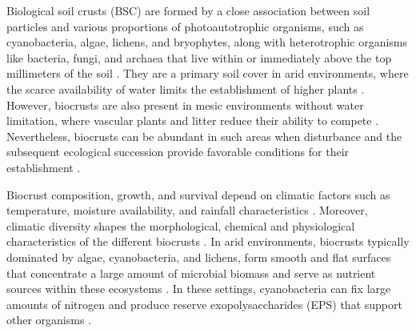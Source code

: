 Biological soil crusts (BSC) are formed by a close association between soil particles and various proportions of photoautotrophic organisms, such as cyanobacteria, algae, lichens, and bryophytes, along with heterotrophic organisms like bacteria, fungi, and archaea that live within or immediately above the top millimeters of the soil \citep{Weber2022}. They are a primary soil cover in arid environments, where the scarce availability of water limits the establishment of higher plants \citep{Ding2020,Weber2022}. However, biocrusts are also present in mesic environments without water limitation, where vascular plants and litter reduce their ability to compete \citep{Corbin2020,Gall2022a}. Nevertheless, biocrusts can be abundant in such areas when disturbance and the subsequent ecological succession provide favorable conditions for their establishment \citep{Budel2014,Gall2022a}.

Biocrust composition, growth, and survival depend on climatic factors such as temperature, moisture availability, and rainfall characteristics \citep{Belnap2003}. Moreover, climatic diversity shapes the morphological, chemical and physiological characteristics of the different biocrusts \citep{ConcostrinaZubiri2014}. In arid environments, biocrusts typically dominated by algae, cyanobacteria, and lichens, form smooth and flat surfaces that concentrate a large amount of microbial biomass and serve as nutrient sources within these ecosystems \citep{Weber2022}. In these settings, cyanobacteria can fix large amounts of nitrogen and produce reserve exopolysaccharides (EPS) that support other organisms \citep{RodriguezCaballero2018,Samolov2020}.


